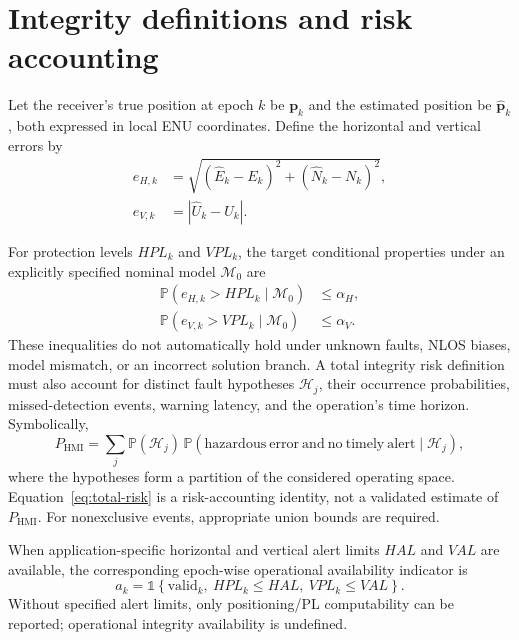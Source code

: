 \documentclass[pdflatex,sn-mathphys-num]{sn-jnl}
\newcommand{\vect}[1]{\boldsymbol{#1}}
\newcommand{\prob}{\mathbb{P}}
\begin{document}
\section{Integrity definitions and risk accounting}\label{sec:integrity}

Let the receiver's true position at epoch $k$ be $\vect{p}_k$ and the
estimated position be $\hat{\vect{p}}_k$, both expressed in local ENU
coordinates. Define the horizontal and vertical errors by
\begin{align}
 e_{H,k} &= \sqrt{(\hat E_k-E_k)^2+(\hat N_k-N_k)^2},\label{eq:eh}\\
 e_{V,k} &= |\hat U_k-U_k|.\label{eq:ev}
\end{align}

For protection levels $HPL_k$ and $VPL_k$, the target conditional
properties under an explicitly specified nominal model $\mathcal{M}_0$ are
\begin{align}
 \prob\!\left(e_{H,k}>HPL_k\mid\mathcal{M}_0\right)&\leq\alpha_H,\label{eq:h-risk}\\
 \prob\!\left(e_{V,k}>VPL_k\mid\mathcal{M}_0\right)&\leq\alpha_V.\label{eq:v-risk}
\end{align}
These inequalities do not automatically hold under unknown faults, NLOS
biases, model mismatch, or an incorrect solution branch. A total integrity
risk definition must also account for distinct fault hypotheses
$\mathcal{H}_j$, their occurrence probabilities, missed-detection events,
warning latency, and the operation's time horizon. Symbolically,
\begin{equation}\label{eq:total-risk}
 P_{\mathrm{HMI}}=\sum_j \prob(\mathcal{H}_j)\,
 \prob\!\left(\mathrm{hazardous\ error\ and\ no\ timely\ alert}\mid
 \mathcal{H}_j\right),
\end{equation}
where the hypotheses form a partition of the considered operating space.
Equation~\eqref{eq:total-risk} is a risk-accounting identity, not a
validated estimate of $P_{\mathrm{HMI}}$. For nonexclusive events,
appropriate union bounds are required.

When application-specific horizontal and vertical alert limits $HAL$
and $VAL$ are available, the corresponding epoch-wise operational
availability indicator is
\begin{equation}\label{eq:avail}
 a_k=\mathbb{1}\!\left\{\text{valid}_k,\ HPL_k\leq HAL,
 \ VPL_k\leq VAL\right\}.
\end{equation}
Without specified alert limits, only positioning/PL computability can be
reported; operational integrity availability is undefined.
\end{document}
